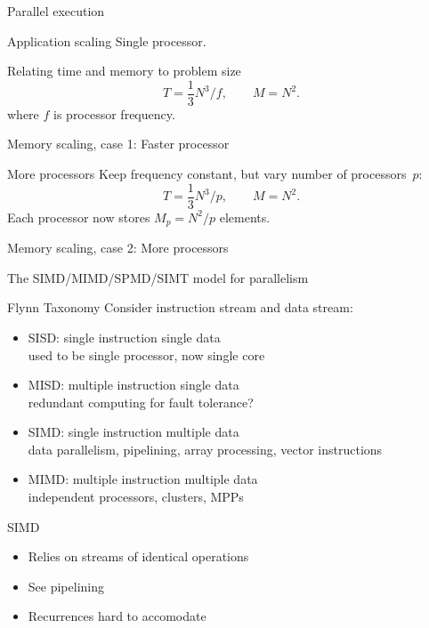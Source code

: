 \begin{exerciseframe}{Parallel execution}
    
\end{exerciseframe}

\begin{numberedframe}{Application scaling}
  Single processor.

  Relating time and memory to problem size
  \[ T=\frac 13 N^3/f,\qquad M=N^2. \]
  where $f$ is processor frequency.
\end{numberedframe}

\begin{exerciseframe}{Memory scaling, case 1: Faster processor}
  
\end{exerciseframe}

\begin{numberedframe}{More processors}
  Keep frequency constant, but vary number of processors~$p$:
  \[ T=\frac 13 N^3/p,\qquad M=N^2. \]
  Each processor now stores $M_p=N^2/p$ elements.  
\end{numberedframe}

\begin{exerciseframe}{Memory scaling, case 2: More processors}
  
\end{exerciseframe}

 {The SIMD/MIMD/SPMD/SIMT model for parallelism}

\begin{numberedframe}{Flynn Taxonomy}
  Consider instruction stream and data stream:
  \begin{itemize}
  \item SISD: single instruction single data\\
    used to be single processor, now single core
  \item MISD: multiple instruction single data\\
    redundant computing for fault tolerance?
  \item SIMD: single instruction multiple data\\
    data parallelism, pipelining, array processing, vector instructions
  \item MIMD: multiple instruction multiple data\\
    independent processors, clusters, MPPs
  \end{itemize}
\end{numberedframe}

\begin{numberedframe}{SIMD}
  \begin{itemize}
  \item Relies on streams of identical operations
  \item See pipelining
  \item Recurrences hard to accomodate
  \end{itemize}
\end{numberedframe}

